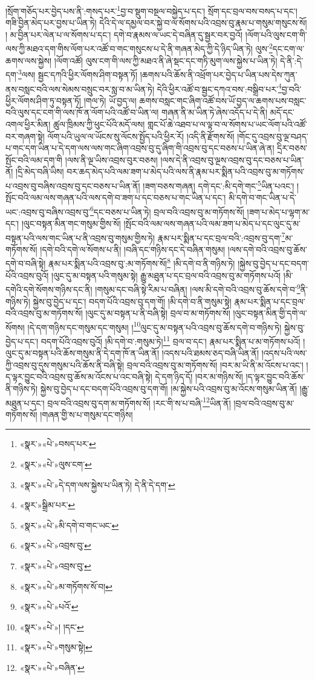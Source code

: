 །སྲོག་གཅོད་པར་བྱེད་པས་ནི་:གསད་པར་\footnote{«སྣར་»«པེ་»བསད་པར་}བྱ་བ་སྡུག་བསྔལ་བསྐྱེད་པ་དང་། སྲོག་དང་བྲལ་བས་བསད་པ་དང་། གཟི་བྱིན་མེད་པར་བྱས་པ་ཡིན་ཏེ། དེའི་དེ་ལ་དམྱལ་བར་སྐྱེ་བ་ལ་སོགས་པའི་འབྲས་བུ་རྣམ་པ་གསུམ་གསུངས་སོ། །
མ་བྱིན་པར་ལེན་པ་ལ་སོགས་པ་དང་། དགེ་བ་རྣམས་ལ་ཡང་དེ་བཞིན་དུ་སྦྱར་བར་བྱའོ། །ལོག་པའི་ལུས་ངག་གི་ལས་ཀྱི་མཐའ་དག་གིས་ལོག་པར་འཚོ་བ་གང་གསུངས་པ་དེ་ནི་གཞན་མེད་ཀྱི་དེ་ཉིད་ཡིན་ཏེ། ལུས་\footnote{«སྣར་»«པེ་»ལུས་ངག་}དང་ངག་ལ་ཆགས་ལས་སྐྱེས། །ལོག་འཚོ། ལུས་ངག་གི་ལས་ཀྱི་མཐའ་ནི་ཞེ་སྡང་དང་གཏི་མུག་ལས་སྐྱེས་པ་ཡིན་ཏེ། དེ་ནི་:དེ་དག་\footnote{«སྣར་»«པེ་»དེ་དག་ལས་སྐྱེས་པ་ཡིན་ཏེ། དེ་ནི་དེ་དག་}ལས། སྦྱང་དཀའི་ཕྱིར་ལོགས་ཤིག་བསྟན་ཏོ། །ཆགས་པའི་ཆོས་ནི་འཕྲོག་པར་བྱེད་པ་ཡིན་པས་དེས་ཀུན་ནས་བསླང་བའི་ལས་སེམས་བསྲུང་བར་སླ་བ་མ་ཡིན་ཏེ། དེའི་ཕྱིར་འཚོ་བ་སྦྱང་དཀའ་བས་:བསྒྲིབ་པར་\footnote{«སྣར་»སྒྲིམ་པར་}བྱ་བའི་ཕྱིར་ལོགས་ཤིག་ཏུ་བསྟན་ཏོ། །གལ་ཏེ། ཡོ་བྱད་ལ། ཆགས་བསླང་གང་ཞིག་འཚོ་བས་ཡོ་བྱད་ལ་ཆགས་པས་བསླང་བའི་ལུས་དང་ངག་གི་ལས་ཁོ་ན་ལོག་པའི་འཚོ་བ་ཡིན་ལ། གཞན་ནི་མ་ཡིན་ཏེ་ཞེས་འདོད་པ་དེ་ནི། མདོ་དང་འགལ་ཕྱིར་མིན། ཚུལ་ཁྲིམས་ཀྱི་ཕུང་པོའི་མདོ་ལས། གླང་པོ་ཆེ་འཐབ་པ་ལ་ལྟ་བ་ལ་སོགས་པ་ཡང་ལོག་པའི་འཚོ་བར་གཞག་སྟེ། ལོག་པའི་ཡུལ་ལ་ཡོངས་སུ་ལོངས་སྤྱོད་པའི་ཕྱིར་རོ། །འདི་ནི་རྫོགས་སོ། །གོང་དུ་འབྲས་བུ་ལྔ་བཤད་པ་གང་དག་ཡིན་པ་དེ་དག་ལས་ལས་གང་ཞིག་འབྲས་བུ་དུ་ཞིག་གི་འབྲས་བུ་དང་བཅས་པ་ཡིན་ཞེ་ན། དྲིར་བཅས་སྤོང་བའི་ལམ་དག་གི །ལས་ནི་ལྔ་ཡིས་འབྲས་བུར་བཅས། །ལས་དེ་ནི་འབྲས་བུ་ལྔས་འབྲས་བུ་དང་བཅས་པ་ཡིན་ནོ། །དྲི་མེད་བཞི་ཡིས། བར་ཆད་མེད་པའི་ལམ་ཟག་པ་མེད་པའི་ལས་ནི་རྣམ་པར་སྨིན་པའི་འབྲས་བུ་མ་གཏོགས་པ་འབྲས་བུ་བཞིས་འབྲས་བུ་དང་བཅས་པ་ཡིན་ནོ། །ཟག་བཅས་གཞན། དགེ་དང་:མི་དགེ་གང་\footnote{«སྣར་»«པེ་»མི་དགེ་བ་གང་ཡང་}ཡིན་པའང་། །སྤོང་བའི་ལམ་ལས་གཞན་པའི་ལས་དགེ་བ་ཟག་པ་དང་བཅས་པ་གང་ཡིན་པ་དང་། མི་དགེ་བ་གང་ཡིན་པ་དེ་ཡང་:འབྲས་བུ་བཞིས་འབྲས་བུ་\footnote{«སྣར་»«པེ་»འབྲས་བུ་}དང་བཅས་པ་ཡིན་ཏེ། བྲལ་བའི་འབྲས་བུ་མ་གཏོགས་སོ། །ཟག་པ་མེད་པ་ལྷག་མ་དང་། །ལུང་བསྟན་མིན་གང་གསུམ་གྱིས་སོ། །སྤོང་བའི་ལམ་ལས་གཞན་པའི་ལམ་ཟག་པ་མེད་པ་དང་ལུང་དུ་མ་བསྟན་པའི་ལས་གང་ཡིན་པ་ནི་འབྲས་བུ་གསུམ་གྱིས་ཏེ། རྣམ་པར་སྨིན་པ་དང་བྲལ་བའི་:འབྲས་བུ་དག་\footnote{«སྣར་»«པེ་»འབྲས་བུ་}མ་གཏོགས་སོ། །དགེ་བའི་དགེ་ལ་སོགས་པ་ནི། །བཞི་དང་གཉིས་དང་དེ་བཞིན་གསུམ། །ལས་དགེ་བའི་འབྲས་བུ་ཆོས་དགེ་བ་བཞི་སྟེ། རྣམ་པར་སྨིན་པའི་འབྲས་བུ་:མ་གཏོགས་སོ།\footnote{«སྣར་»«པེ་»མ་གཏོགས་སོ་བ།} །མི་དགེ་བ་ནི་གཉིས་ཏེ། །སྐྱེས་བུ་བྱེད་པ་དང་བདག་པོའི་འབྲས་བུའོ། །ལུང་དུ་མ་བསྟན་པའི་གསུམ་སྟེ། རྒྱུ་མཐུན་པ་དང་བྲལ་བའི་འབྲས་བུ་མ་གཏོགས་པའོ། །མི་དགེའི་དགེ་སོགས་གཉིས་དང་ནི། །གསུམ་དང་བཞི་སྟེ་རིམ་པ་བཞིན། །ལས་མི་དགེ་བའི་འབྲས་བུ་ཆོས་དགེ་བ་\footnote{«སྣར་»«པེ་»པའོ་}ནི་གཉིས་ཏེ། སྐྱེས་བུ་བྱེད་པ་དང་། བདག་པོའི་འབྲས་བུ་དག་གོ། །མི་དགེ་བ་ནི་གསུམ་སྟེ། རྣམ་པར་སྨིན་པ་དང་བྲལ་བའི་འབྲས་བུ་མ་གཏོགས་སོ། །ལུང་དུ་མ་བསྟན་པ་ནི་བཞི་སྟེ། བྲལ་བ་མ་གཏོགས་སོ། །ལུང་བསྟན་མིན་གྱི་དགེ་ལ་སོགས། །དེ་དག་གཉིས་དང་གསུམ་དང་གསུམ། །\footnote{«སྣར་»«པེ་»། །དང་}ལུང་དུ་མ་བསྟན་པའི་འབྲས་བུ་ཆོས་དགེ་བ་གཉིས་ཏེ། སྐྱེས་བུ་བྱེད་པ་དང་། བདག་པོའི་འབྲས་བུའོ། །མི་དགེ་བ་:གསུམ་ཏེ།\footnote{«སྣར་»«པེ་»གསུམ་སྟེ།} བྲལ་བ་དང་། རྣམ་པར་སྨིན་པ་མ་གཏོགས་པའོ། །ལུང་དུ་མ་བསྟན་པའི་ཆོས་གསུམ་ནི་དེ་དག་ཁོ་ན་ཡིན་ནོ། །འདས་པའི་ཐམས་ཅད་བཞི་ཡིན་ནོ། །འདས་པའི་ལས་ཀྱི་འབྲས་བུ་དུས་གསུམ་པའི་ཆོས་ནི་བཞི་སྟེ། བྲལ་བའི་འབྲས་བུ་མ་གཏོགས་སོ། །བར་མ་ཡི་ནི་མ་འོངས་པ་འང་། །ད་ལྟར་བྱུང་བའི་འབྲས་བུ་ཆོས་མ་འོངས་པ་འང་བཞི་སྟེ། དེ་དག་ཉིད་དོ། །བར་མ་གཉིས་སོ། །ད་ལྟར་བྱུང་བའི་ཆོས་ནི་གཉིས་ཏེ། སྐྱེས་བུ་བྱེད་པ་དང་བདག་པོའི་འབྲས་བུ་དག་གོ། །མ་སྐྱེས་པའི་འབྲས་བུ་མ་འོངས་གསུམ་ཡིན་ནོ། །རྒྱུ་མཐུན་པ་དང་། བྲལ་བའི་འབྲས་བུ་དག་མ་གཏོགས་སོ། །རང་གི་ས་པ་བཞི་\footnote{«སྣར་»«པེ་»བཞིན་}ཡིན་ནོ། །བྲལ་བའི་འབྲས་བུ་མ་གཏོགས་སོ། །གཞན་གྱི་ས་པ་གསུམ་དང་གཉིས། 